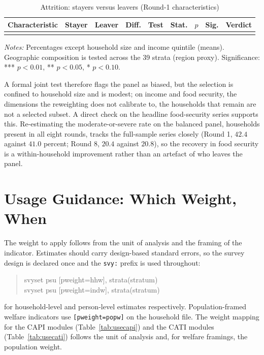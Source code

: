 \documentclass[AEJ]{AEA}
\begin{document}
\begin{table}[!t]
\raggedright
\begin{threeparttable}
\caption{Attrition: stayers versus leavers (Round-1 characteristics)}
\label{tab:attrbias}
\footnotesize
\setlength{\tabcolsep}{5pt}
\begin{tabular}{@{}l r r r c r r c l@{}}
\toprule
Characteristic & Stayer & Leaver & Diff. & Test & Stat. & $p$ & Sig. & Verdict \\
\midrule
\\
\bottomrule
\end{tabular}
\begin{tablenotes}\notesize
\item \textit{Notes:} Percentages except household size and income quintile
(means). Geographic composition is tested across the 39 strata (region proxy).
Significance: *** $p<0.01$, ** $p<0.05$, * $p<0.10$.
\end{tablenotes}
\end{threeparttable}
\end{table}

A formal joint test therefore flags the panel as biased, but the selection is
confined to household size and is modest; on income and food security, the
dimensions the reweighting does not calibrate to, the households that remain are
not a selected subset. A direct check on the headline food-security series supports
this. Re-estimating the moderate-or-severe rate on the balanced panel, households
present in all eight rounds, tracks the full-sample series closely (Round 1, $42.4$
against $41.0$ percent; Round 8, $20.4$ against $20.8$), so the recovery in food
security is a within-household improvement rather than an artefact of who leaves
the panel.

\section{Usage Guidance: Which Weight, When}

The weight to apply follows from the unit of analysis and the framing of the
indicator. Estimates should carry design-based standard errors, so the survey
design is declared once and the \texttt{svy:} prefix is used throughout:
%
\begin{quote}\ttfamily
svyset psu [pweight=hhw], strata(stratum)\\
svyset psu [pweight=indw], strata(stratum)
\end{quote}
%
for household-level and person-level estimates respectively. Population-framed
welfare indicators use \texttt{[pweight=popw]} on the household file. The weight
mapping for the CAPI modules (Table~\ref{tab:usecapi}) and the CATI modules
(Table~\ref{tab:usecati}) follows the unit of analysis and, for welfare framings,
the population weight.
\end{document}
